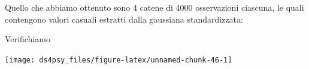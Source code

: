 \documentclass[
  11pt,
]{krantz}
\makeatletter
\newenvironment{Shaded}{\begin{snugshade}}{\end{snugshade}}
\newcommand{\DecValTok}[1]{\textcolor[rgb]{0.06,0.06,0.06}{#1}}
\newcommand{\FunctionTok}[1]{\textcolor[rgb]{0,0,0}{#1}}
\newcommand{\NormalTok}[1]{#1}
\newcommand{\SpecialCharTok}[1]{\textcolor[rgb]{0,0,0}{#1}}
\newenvironment{kframe}{%
\medskip{}
\setlength{\fboxsep}{.8em}
 \def\at@end@of@kframe{}%
 \ifinner\ifhmode%
  \def\at@end@of@kframe{\end{minipage}}%
  \begin{minipage}{\columnwidth}%
 \fi\fi%
 \def\FrameCommand##1{\hskip\@totalleftmargin \hskip-\fboxsep
 \colorbox{shadecolor}{##1}\hskip-\fboxsep
     \hskip-\linewidth \hskip-\@totalleftmargin \hskip\columnwidth}%
 \MakeFramed {\advance\hsize-\width
   \@totalleftmargin\z@ \linewidth\hsize
   \@setminipage}}%
 {\par\unskip\endMakeFramed%
 \at@end@of@kframe}
\renewenvironment{Shaded}{\begin{kframe}}{\end{kframe}}
\theoremstyle{definition}
\theoremstyle{definition}
\theoremstyle{definition}
\theoremstyle{definition}
\theoremstyle{remark}
\makeatother
\begin{document}
Quello che abbiamo ottenuto sono 4 catene di 4000 osservazioni ciascuna, le quali contengono valori casuali estratti dalla gaussiana standardizzata:

\begin{Shaded}
\end{Shaded}

Verifichiamo

\begin{Shaded}
\end{Shaded}

\begin{center}\texttt{[image: ds4psy\_files/figure-latex/unnamed-chunk-46-1]} \end{center}

  

\printindex
\end{document}
